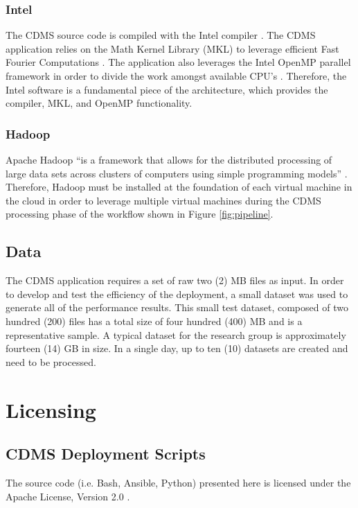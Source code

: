 \documentclass[9pt,twocolumn,twoside]{../../styles/osajnl}
\begin{document}
\subsubsection{Intel} 
The CDMS source code is compiled with the Intel compiler
\cite{www-intel}. The CDMS application relies on the Math Kernel
Library (MKL) to leverage efficient Fast Fourier Computations
\cite{www-intel-mkl}. The application also leverages the Intel OpenMP
parallel framework in order to divide the work amongst available CPU's
\cite{www-openmp}. Therefore, the Intel software is a fundamental
piece of the architecture, which provides the compiler, MKL, and
OpenMP functionality.

\subsubsection{Hadoop} 
Apache Hadoop ``is a framework that allows for the distributed
processing of large data sets across clusters of computers using
simple programming models'' \cite{www-hadoop}. Therefore, Hadoop must
be installed at the foundation of each virtual machine in the cloud in
order to leverage multiple virtual machines during the CDMS processing
phase of the workflow shown in Figure \ref{fig:pipeline}.

\subsection{Data} \label{data}
The CDMS application requires a set of raw two (2) MB files as
input. In order to develop and test the efficiency of the deployment,
a small dataset was used to generate all of the performance
results. This small test dataset, composed of two hundred (200) files
has a total size of four hundred (400) MB and is a representative
sample. A typical dataset for the research group is approximately
fourteen (14) GB in size. In a single day, up to ten (10) datasets are
created and need to be processed.

\section{Licensing} \label{licensing}
\subsection{CDMS Deployment Scripts} \label{source-license}
The source code (i.e. Bash, Ansible, Python) presented here is
licensed under the Apache License, Version 2.0 \cite{www-apache-lic}.
\end{document}
